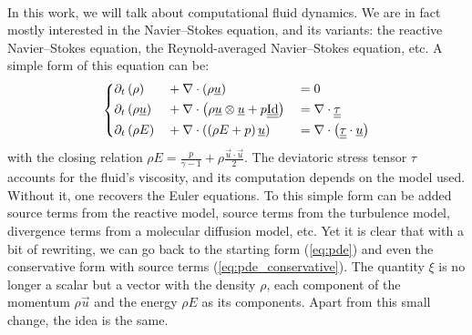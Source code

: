     \paragraph{}
    In this work, we will talk about computational fluid dynamics.
    We are in fact mostly interested in the Navier--Stokes equation, and its variants: the reactive Navier--Stokes equation, the Reynold-averaged Navier--Stokes equation, etc.
    A simple form of this equation can be:
    \begin{equation}\label{eq:ns}
      \left\{\begin{aligned}
        &\partial_t\left(\rho         \right) &&+ \nabla\cdot\left( \rho \underline{u} \right) &&= 0 \\
        &\partial_t\left(\rho \underline{u} \right) &&+ \nabla\cdot\left( \rho \underline{u} \otimes \underline{u} + p \underline{\underline{\operatorname{Id}}} \right) &&= \nabla\cdot \underline{\underline{\tau}}\\
        &\partial_t\left( \rho E      \right) &&+ \nabla\cdot\left( \left(\rho E + p\right) \underline{u} \right) &&=
          \nabla\cdot\left( \underline{\underline{\tau}} \cdot \underline{u} \right)
      \end{aligned}\right.
    \end{equation}
    with the closing relation $\rho E = \frac{p}{\gamma - 1} + \rho\frac{\vec{u} \cdot \vec{u}}{2}$.
    The deviatoric stress tensor $\tau$ accounts for the fluid's viscosity, and its computation depends on the model used.
    Without it, one recovers the Euler equations.
    To this simple form can be added source terms from the reactive model, source terms from the turbulence model, divergence terms from a molecular diffusion model, etc.
    Yet it is clear that with a bit of rewriting, we can go back to the starting form (\ref{eq:pde}) and even the conservative form with source terms (\ref{eq:pde_conservative}).
    The quantity $\xi$ is no longer a scalar but a vector with the density $\rho$, each component of the momentum $\rho\vec{u}$ and the energy $\rho E$ as its components.
    Apart from this small change, the idea is the same.

